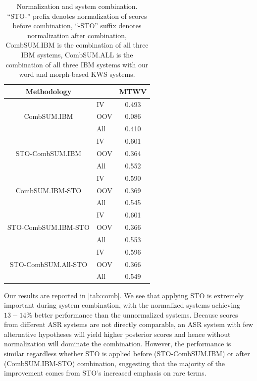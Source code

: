 \documentclass[a4paper,oneside,reqno]{amsart}
\begin{document}
\begin{table}[ht!]
  \begin{tabular}{clc}
    \toprule
    Methodology & & MTWV \\
    \midrule
    \multirow{3}{*}{CombSUM.IBM}         & IV  & 0.493 \\
                                         & OOV & 0.086 \\
                                         & All & 0.410 \\
    \hline
    \multirow{3}{*}{STO-CombSUM.IBM}     & IV  & 0.601 \\
                                         & OOV & 0.364 \\
                                         & All & 0.552 \\
    \hline
    \multirow{3}{*}{CombSUM.IBM-STO}     & IV  & 0.590 \\
                                         & OOV & 0.369 \\
                                         & All & 0.545 \\
    \hline
    \multirow{3}{*}{STO-CombSUM.IBM-STO} & IV  & 0.601 \\
                                         & OOV & 0.366 \\
                                         & All & 0.553 \\

    \hline
    \multirow{3}{*}{STO-CombSUM.All-STO} & IV  & 0.596 \\
                                         & OOV & 0.366 \\
                                         & All & 0.549 \\
    \bottomrule
  \end{tabular}
  \caption{Normalization and system combination. ``STO-'' prefix denotes
  normalization of scores before combination, ``-STO'' suffix denotes normalization
  after combination, CombSUM.IBM is the combination of all three IBM systems,
  CombSUM.ALL is the combination of all three IBM systems with our word and
  morph-based KWS systems.}
  \label{tab:comb}
\end{table}

Our results are reported in \autoref{tab:comb}. We see that applying STO is
extremely important during system combination, with the normalized systems
achieving $13-14\%$ better performance than the unnormalized systems. Because
scores from different ASR systems are not directly comparable, an ASR system
with few alternative hypotheses will yield higher posterior scores and hence
without normalization will dominate the combination. However, the performance
is similar regardless whether STO is applied before (STO-CombSUM.IBM) or after
(CombSUM.IBM-STO) combination, suggesting that the majority of the improvement
comes from STO's increased emphasis on rare terms.
\end{document}
